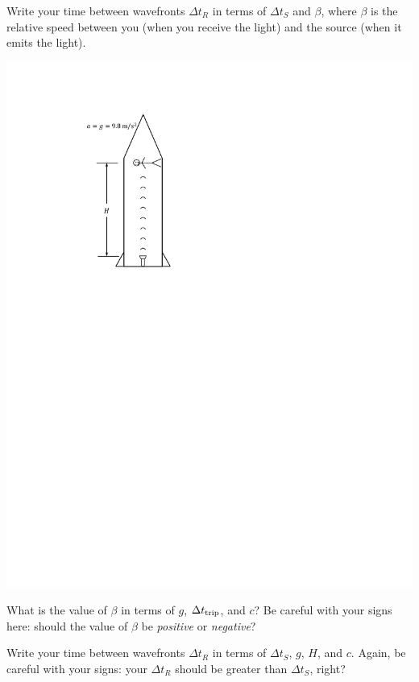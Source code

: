 \begin{enumerate}[labparts]
\begin{minipage}{0.6\textwidth}
\item Write your time between wavefronts $\Delta t_R$ in terms of $\Delta t_S$ and $\beta$, where $\beta$ is the relative speed between you (when you receive the light) and the source (when it emits the light).
\answerspace{0.5in}
\end{minipage}
\begin{minipage}{0.39\textwidth}
\hspace{\fill}\includegraphics{gravity_time/accelerating_rocket.pdf}
\end{minipage}

\item What is the value of $\beta$ in terms of $g$, $\Delta t_{\rm trip}$, and $c$?  Be careful with your signs here: should the value of $\beta$ be \textit{positive} or \textit{negative}?
\answerspace{0.5in}

\item Write your time between wavefronts $\Delta t_R$ in terms of $\Delta t_S$, $g$, $H$, and $c$.  Again, be careful with your signs: your $\Delta t_R$ should be greater than $\Delta t_S$, right?
\answerspace{0.5in}

\end{enumerate}